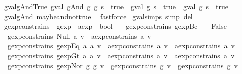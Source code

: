 \begin{isabellebody}
{\isafoldproof}%
%
\isadelimproof
\isanewline
%
\endisadelimproof
\isanewline
{}\isamarkupfalse%
\ gval{\isacharunderscore}gAnd{\isacharunderscore}True{\isacharcolon}\ {\isachardoublequoteopen}{\isacharparenleft}gval\ {\isacharparenleft}gAnd\ g{}\ g{}{\isacharparenright}\ s\ {\isacharequal}\ true{\isacharparenright}\ {\isacharequal}\ {\isacharparenleft}{\isacharparenleft}gval\ g{}\ s\ {\isacharequal}\ true{\isacharparenright}\ {\isasymand}\ gval\ g{}\ s\ {\isacharequal}\ true{\isacharparenright}{\isachardoublequoteclose}\isanewline
%
\isadelimproof
\ \ %
\endisadelimproof
%
\isatagproof
{}\isamarkupfalse%
\ gval{\isacharunderscore}gAnd\ maybe{\isacharunderscore}and{\isacharunderscore}not{\isacharunderscore}true\ \isamarkupfalse%
\ fastforce%
\endisatagproof
{\isafoldproof}%
%
\isadelimproof
\isanewline
%
\endisadelimproof
\isanewline
{}\isamarkupfalse%
\ gval{\isachardot}simps\ {\isacharbrackleft}simp\ del{\isacharbrackright}\isanewline
\isanewline
{}\isamarkupfalse%
\ gexp{\isacharunderscore}constrains\ {\isacharcolon}{\isacharcolon}\ {\isachardoublequoteopen}gexp\ {\isasymRightarrow}\ aexp\ {\isasymRightarrow}\ bool{\isachardoublequoteclose}\ \isanewline
\ \ {\isachardoublequoteopen}gexp{\isacharunderscore}constrains\ {\isacharparenleft}gexp{\isachardot}Bc\ {\isacharunderscore}{\isacharparenright}\ {\isacharunderscore}\ {\isacharequal}\ False{\isachardoublequoteclose}\ {\isacharbar}\isanewline
\ \ {\isachardoublequoteopen}gexp{\isacharunderscore}constrains\ {\isacharparenleft}Null\ a{\isacharparenright}\ v\ {\isacharequal}\ aexp{\isacharunderscore}constrains\ a\ v{\isachardoublequoteclose}\ {\isacharbar}\isanewline
\ \ {\isachardoublequoteopen}gexp{\isacharunderscore}constrains\ {\isacharparenleft}gexp{\isachardot}Eq\ a{}\ a{}{\isacharparenright}\ v\ {\isacharequal}\ {\isacharparenleft}aexp{\isacharunderscore}constrains\ a{}\ v\ {\isasymor}\ aexp{\isacharunderscore}constrains\ a{}\ v{\isacharparenright}{\isachardoublequoteclose}\ {\isacharbar}\isanewline
\ \ {\isachardoublequoteopen}gexp{\isacharunderscore}constrains\ {\isacharparenleft}gexp{\isachardot}Gt\ a{}\ a{}{\isacharparenright}\ v\ {\isacharequal}\ {\isacharparenleft}aexp{\isacharunderscore}constrains\ a{}\ v\ {\isasymor}\ aexp{\isacharunderscore}constrains\ a{}\ v{\isacharparenright}{\isachardoublequoteclose}\ {\isacharbar}\isanewline
\ \ {\isachardoublequoteopen}gexp{\isacharunderscore}constrains\ {\isacharparenleft}gexp{\isachardot}Nor\ g{}\ g{}{\isacharparenright}\ v\ {\isacharequal}\ {\isacharparenleft}gexp{\isacharunderscore}constrains\ g{}\ v\ {\isasymor}\ gexp{\isacharunderscore}constrains\ g{}\ v{\isacharparenright}{\isachardoublequoteclose}\isanewline

\end{isabellebody}

